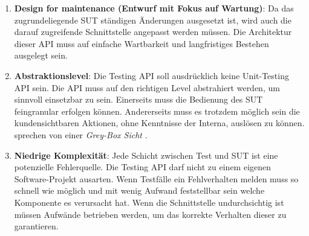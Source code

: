 \begin{enumerate}
\item \textbf{Design for maintenance (Entwurf mit Fokus auf Wartung)}: Da das zugrundeliegende \Gls{SUT} ständigen Änderungen ausgesetzt ist, wird auch die darauf zugreifende Schnittstelle angepasst werden müssen. Die Architektur dieser API muss auf einfache Wartbarkeit und langfristiges Bestehen ausgelegt sein.
\item \textbf{Abstraktionslevel}: Die Testing API soll ausdrücklich keine Unit-Testing API sein. Die API muss auf den richtigen Level abstrahiert werden, um sinnvoll einsetzbar zu sein. Einerseits muss die Bedienung des \Gls{SUT} feingranular erfolgen können. Andererseits muss es trotzdem möglich sein die kundensichtbaren Aktionen, ohne Kenntnisse der Interna, auslösen zu können. \citeauthor{tyler_black-box_2004} sprechen von einer \textit{Grey-Box Sicht} \cite{tyler_black-box_2004}.
\item \textbf{Niedrige Komplexität}: Jede Schicht zwischen Test und \Gls{SUT} ist eine potenzielle Fehlerquelle. Die Testing API darf nicht zu einem eigenen Software-Projekt ausarten. Wenn Testfälle ein Fehlverhalten melden muss so schnell wie möglich und mit wenig Aufwand feststellbar sein welche Komponente es verursacht hat. Wenn die Schnittstelle undurchsichtig ist müssen Aufwände betrieben werden, um das korrekte Verhalten dieser zu garantieren.
\end{enumerate}

